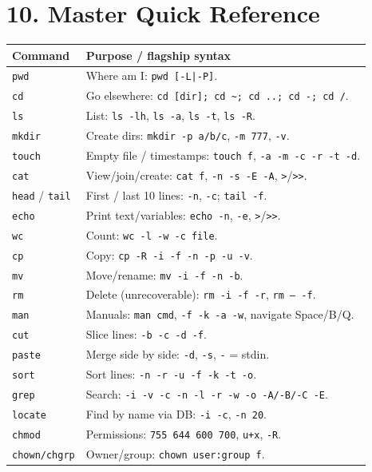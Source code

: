 \documentclass[11pt,a4paper]{article}
\newcommand{\cmd}[1]{\texttt{#1}}
\begin{document}
\section{10. Master Quick Reference}

\begin{center}
\small
\begin{longtable}{ll}
\toprule
Command & Purpose / flagship syntax \\
\midrule
\endhead
\bottomrule
\endfoot
\cmd{pwd} & Where am I: \cmd{pwd [-L|-P]}. \\
\cmd{cd} & Go elsewhere: \cmd{cd [dir]; cd \textasciitilde; cd ..; cd -; cd /}. \\
\cmd{ls} & List: \cmd{ls -lh}, \cmd{ls -a}, \cmd{ls -t}, \cmd{ls -R}. \\
\cmd{mkdir} & Create dirs: \cmd{mkdir -p a/b/c}, \cmd{-m 777}, \cmd{-v}. \\
\cmd{touch} & Empty file / timestamps: \cmd{touch f}, \cmd{-a -m -c -r -t -d}. \\
\cmd{cat} & View/join/create: \cmd{cat f}, \cmd{-n -s -E -A}, \cmd{>}/\cmd{>>}. \\
\cmd{head} / \cmd{tail} & First / last 10 lines: \cmd{-n}, \cmd{-c}; \cmd{tail -f}. \\
\cmd{echo} & Print text/variables: \cmd{echo -n}, \cmd{-e}, \cmd{>}/\cmd{>>}. \\
\cmd{wc} & Count: \cmd{wc -l -w -c file}. \\
\cmd{cp} & Copy: \cmd{cp -R -i -f -n -p -u -v}. \\
\cmd{mv} & Move/rename: \cmd{mv -i -f -n -b}. \\
\cmd{rm} & Delete (unrecoverable): \cmd{rm -i -f -r}, \cmd{rm -- -f}. \\
\cmd{man} & Manuals: \cmd{man cmd}, \cmd{-f -k -a -w}, navigate Space/B/Q. \\
\cmd{cut} & Slice lines: \cmd{-b -c -d -f}. \\
\cmd{paste} & Merge side by side: \cmd{-d}, \cmd{-s}, \cmd{-} = stdin. \\
\cmd{sort} & Sort lines: \cmd{-n -r -u -f -k -t -o}. \\
\cmd{grep} & Search: \cmd{-i -v -c -n -l -r -w -o -A/-B/-C -E}. \\
\cmd{locate} & Find by name via DB: \cmd{-i -c}, \cmd{-n 20}. \\
\cmd{chmod} & Permissions: \cmd{755 644 600 700}, \cmd{u+x}, \cmd{-R}. \\
\cmd{chown/chgrp} & Owner/group: \cmd{chown user:group f}. \\

\end{longtable}
\end{center}
\end{document}
